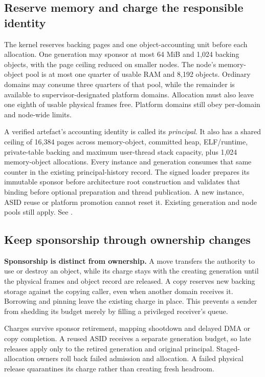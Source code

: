 \subsection{Reserve memory and charge the responsible identity}

The kernel reserves backing pages and one object-accounting unit before each
allocation. One generation may sponsor at most 64 MiB and 1,024 backing objects,
with the page ceiling reduced on smaller nodes. The node's memory-object pool
is at most one quarter of usable RAM and 8,192 objects. Ordinary domains may
consume three quarters of that pool, while the remainder is available to
supervisor-designated platform domains. Allocation must also leave one eighth
of usable physical frames free. Platform domains still obey per-domain and
node-wide limits.

A verified artefact's accounting identity is called its \emph{principal}.
It also has a shared ceiling of 16,384 pages across
memory-object, committed heap, ELF/runtime, private-table backing and maximum
user-thread stack capacity, plus 1,024 memory-object allocations. Every instance
and generation consumes that same counter in the existing principal-history
record. The signed loader prepares its immutable sponsor before architecture root
construction and validates that binding before optional preparation and thread
publication. A new instance, ASID reuse or platform promotion cannot reset it.
Existing generation and node pools still apply.
See .

\subsection{Keep sponsorship through ownership changes}

\textbf{Sponsorship is distinct from ownership.} A move transfers the authority
to use or destroy an object, while its charge stays with the creating
generation until the physical frames and object record are released. A copy
reserves new backing storage against the copying caller, even when another
domain receives it. Borrowing and pinning leave the existing charge in place. This
prevents a sender from shedding its budget merely by filling a privileged
receiver's queue.

Charges survive sponsor retirement, mapping shootdown and delayed DMA or copy
completion. A reused ASID receives a separate generation budget, so late releases
apply only to the retired generation and original principal. Staged-allocation
owners roll back failed admission and allocation. A failed physical release
quarantines its charge rather than creating fresh headroom.

